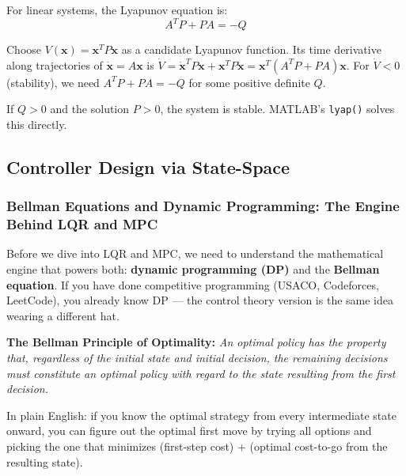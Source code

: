 For linear systems, the Lyapunov equation is:
\begin{equation}
A^T P + PA = -Q
\end{equation}

Choose $V(\mathbf{x}) = \mathbf{x}^T P \mathbf{x}$ as a candidate Lyapunov function. Its time derivative along trajectories of $\dot{\mathbf{x}} = A\mathbf{x}$ is $\dot{V} = \dot{\mathbf{x}}^T P \mathbf{x} + \mathbf{x}^T P \dot{\mathbf{x}} = \mathbf{x}^T(A^T P + PA)\mathbf{x}$. For $\dot{V} < 0$ (stability), we need $A^T P + PA = -Q$ for some positive definite $Q$.

If $Q > 0$ and the solution $P > 0$, the system is stable. MATLAB's \texttt{lyap()} solves this directly.

\subsection{Controller Design via State-Space}

\subsubsection{Bellman Equations and Dynamic Programming: The Engine Behind LQR and MPC}

Before we dive into LQR and MPC, we need to understand the mathematical engine that powers both: \textbf{dynamic programming (DP)} and the \textbf{Bellman equation}. If you have done competitive programming (USACO, Codeforces, LeetCode), you already know DP --- the control theory version is the same idea wearing a different hat.

\textbf{The Bellman Principle of Optimality:} \textit{An optimal policy has the property that, regardless of the initial state and initial decision, the remaining decisions must constitute an optimal policy with regard to the state resulting from the first decision.}

In plain English: if you know the optimal strategy from every intermediate state onward, you can figure out the optimal first move by trying all options and picking the one that minimizes (first-step cost) + (optimal cost-to-go from the resulting state).

